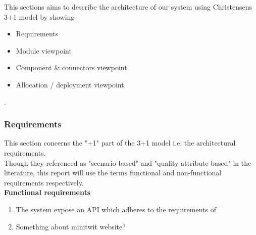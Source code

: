 This sections aims to describe the architecture of our system using Christensens 3+1 model \cite{architecturemodel} by showing
\begin{itemize}
    \item Requirements
    \item Module viewpoint 
    \item Component \& connectors viewpoint 
    \item Allocation / deployment viewpoint
\end{itemize}.
    
\subsubsection{Requirements}    
This section concerns the "+1" part of the 3+1 model i.e. the architectural requirements. \\
Though they referenced as "scenario-based" and "quality attribute-based" in the literature, this 
report will use the terms functional and non-functional requirements respectively. \\

\noindent
\textbf{Functional requirements}
\begin{enumerate}
    \item The system expose an API which adheres to the requirements of \cite{apispec} 
    \item Something about minitwit website?
\end{enumerate} 

